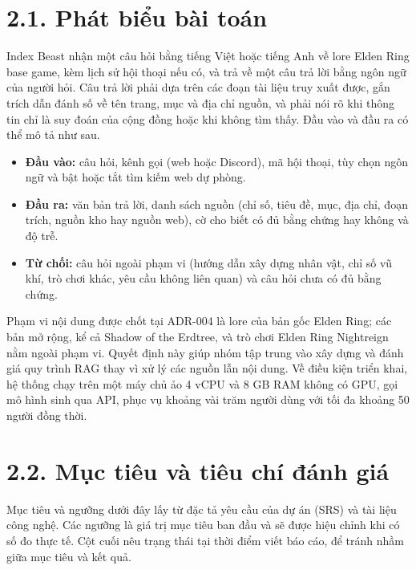 
\section{2.1. Phát biểu bài toán}

Index Beast nhận một câu hỏi bằng tiếng Việt hoặc tiếng Anh về lore Elden Ring base game, kèm lịch sử hội thoại nếu có, và trả về một câu trả lời bằng ngôn ngữ của người hỏi. Câu trả lời phải dựa trên các đoạn tài liệu truy xuất được, gắn trích dẫn đánh số về tên trang, mục và địa chỉ nguồn, và phải nói rõ khi thông tin chỉ là suy đoán của cộng đồng hoặc khi không tìm thấy. Đầu vào và đầu ra có thể mô tả như sau.


\begin{itemize}
\item \textbf{Đầu vào:} câu hỏi, kênh gọi (web hoặc Discord), mã hội thoại, tùy chọn ngôn ngữ và bật hoặc tắt tìm kiếm web dự phòng.
\item \textbf{Đầu ra:} văn bản trả lời, danh sách nguồn (chỉ số, tiêu đề, mục, địa chỉ, đoạn trích, nguồn kho hay nguồn web), cờ cho biết có đủ bằng chứng hay không và độ trễ.
\item \textbf{Từ chối:} câu hỏi ngoài phạm vi (hướng dẫn xây dựng nhân vật, chỉ số vũ khí, trò chơi khác, yêu cầu không liên quan) và câu hỏi chưa có đủ bằng chứng.
\end{itemize}


Phạm vi nội dung được chốt tại ADR-004 là lore của bản gốc Elden Ring; các bản mở rộng, kể cả Shadow of the Erdtree, và trò chơi Elden Ring Nightreign nằm ngoài phạm vi. Quyết định này giúp nhóm tập trung vào xây dựng và đánh giá quy trình RAG thay vì xử lý các nguồn lẫn nội dung. Về điều kiện triển khai, hệ thống chạy trên một máy chủ ảo 4 vCPU và 8 GB RAM không có GPU, gọi mô hình sinh qua API, phục vụ khoảng vài trăm người dùng với tối đa khoảng 50 người đồng thời.


\section{2.2. Mục tiêu và tiêu chí đánh giá}

Mục tiêu và ngưỡng dưới đây lấy từ đặc tả yêu cầu của dự án (SRS) và tài liệu công nghệ. Các ngưỡng là giá trị mục tiêu ban đầu và sẽ được hiệu chỉnh khi có số đo thực tế. Cột cuối nêu trạng thái tại thời điểm viết báo cáo, để tránh nhầm giữa mục tiêu và kết quả.



